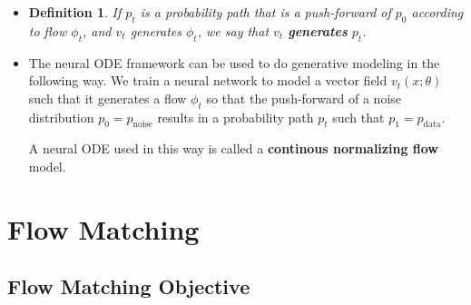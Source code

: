 \documentclass[10pt]{article}
\newtheorem{definition}[lemma]{Definition}
\newcommand{\mrm}[1]{\mathrm{#1}}
\newcommand{\data}{\mathrm{data}}
\begin{document}
\begin{itemize}
  \item \begin{definition} 
    If $p_t$ is a probability path that is a push-forward of $p_0$ according to flow $\phi_t$, and $v_t$ generates $\phi_t$, we say that $v_t$ {\bf generates} $p_t$.
  \end{definition}
  
  \item The neural ODE framework can be used to do generative modeling in the following way. We train a neural network to model a vector field $v_t(x;\theta)$ such that it generates a flow $\phi_t$ so that the push-forward of a noise distribution $p_0 = p_{\mrm{noise}}$ results in a probability path $p_t$ such that $p_1 = p_{\data}$.
  
  A neural ODE used in this way is called a {\bf continous normalizing flow} model.
\end{itemize}

\section{Flow Matching}

\subsection{Flow Matching Objective}
\end{document}
